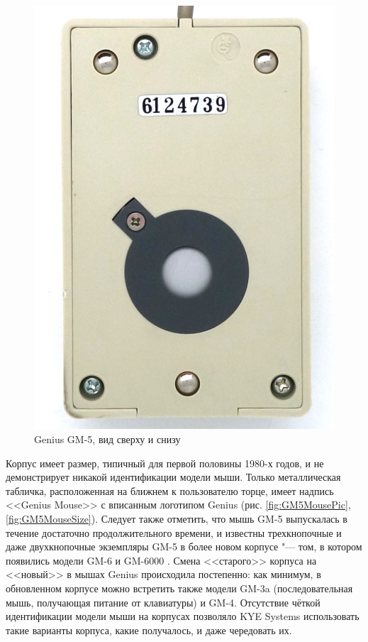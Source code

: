 \documentclass[11pt, a4paper]{article}
\begin{document}
\begin{figure}[h]
    \includegraphics[scale=0.75]{1987_genius_gm5_mouse/bottom_30.jpg}
    \caption{Genius GM-5, вид сверху и снизу}
    \label{fig:GM5MouseTopAndBottom}
\end{figure}

Корпус имеет размер, типичный для первой половины 1980-х годов, и не демонстрирует никакой идентификации модели мыши. Только металлическая табличка, расположенная на ближнем к пользователю торце, имеет надпись <<Genius Mouse>> с вписанным логотипом Genius (рис. \ref{fig:GM5MousePic}, \ref{fig:GM5MouseSize}). Следует также отметить, что мышь GM-5 выпускалась в течение достаточно продолжительного времени, и известны трехкнопочные и даже двухкнопочные экземпляры GM-5 в более новом корпусе "--- том, в котором появились модели  GM-6 и GM-6000 \cite{commodore, atari}. Смена <<старого>> корпуса на <<новый>> в мышах Genius происходила постепенно: как минимум, в обновленном корпусе можно встретить также модели GM-3a (последовательная мышь, получающая питание от клавиатуры) и GM-4. Отсутствие чёткой идентификации модели мыши на корпусах позволяло KYE Systems использовать такие варианты корпуса, какие получалось, и даже чередовать их.
\end{document}
